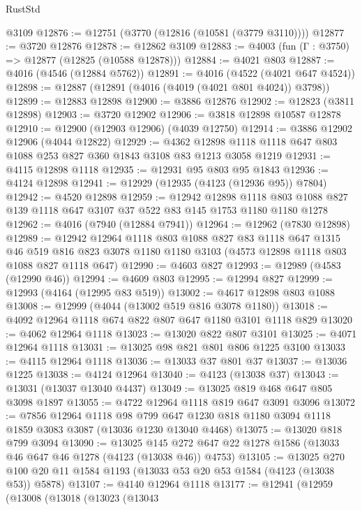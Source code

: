 \begin{lexlean}{RustStd}
\begin{coremodule}
    @3109
@12876 := @12751 (@3770 (@12816 (@10581 (@3779 @3110))))
@12877 := @3720 @12876
@12878 := @12862 @3109
@12883 := @4003 (fun (Γ : @3750) => @12877 (@12825 (@10588 @12878)))
@12884 := @4021 @803
@12887 := @4016 (@4546 (@12884 @5762))
@12891 := @4016 (@4522 (@4021 @647 @4524))
@12898 := @12887 (@12891 (@4016 (@4019 (@4021 @801 @4024)) @3798))
@12899 := @12883 @12898
@12900 := @3886 @12876
@12902 := @12823 (@3811 @12898)
@12903 := @3720 @12902
@12906 := @3818 @12898 @10587 @12878
@12910 := @12900 (@12903 @12906) (@4039 @12750)
@12914 := @3886 @12902 @12906 (@4044 @12822)
@12929 := @4362 @12898 @1118 @1118 @647 @803 @1088 @253 @827 @360 @1843 @3108 @83 @1213 @3058 @1219
@12931 := @4115 @12898 @1118
@12935 := @12931 @95 @803 @95 @1843
@12936 := @4124 @12898
@12941 := @12929 (@12935 (@4123 (@12936 @95)) @7804)
@12942 := @4520 @12898
@12959 := @12942
    @12898
    @1118
    @803
    @1088
    @827
    @139
    @1118
    @647
    @3107
    @37
    @522
    @83
    @145
    @1753
    @1180
    @1180
    @1278
@12962 := @4016 (@7940 (@12884 @7941))
@12964 := @12962 (@7830 @12898)
@12989 := @12942
    @12964
    @1118
    @803
    @1088
    @827
    @83
    @1118
    @647
    @1315
    @46
    @519
    @816
    @823
    @3078
    @1180
    @1180
    @3103
    (@4573 @12898 @1118 @803 @1088 @827 @1118 @647)
@12990 := @4603 @827
@12993 := @12989 (@4583 (@12990 @46))
@12994 := @4609 @803
@12995 := @12994 @827
@12999 := @12993 (@4164 (@12995 @83 @519))
@13002 := @4617 @12898 @803 @1088
@13008 := @12999 (@4044 (@13002 @519 @816 @3078 @1180))
@13018 := @4092 @12964 @1118 @674 @822 @807 @647 @1180 @3101 @1118 @829
@13020 := @4062 @12964 @1118
@13023 := @13020 @822 @807 @3101
@13025 := @4071 @12964 @1118
@13031 := @13025 @98 @821 @801 @806 @1225 @3100
@13033 := @4115 @12964 @1118
@13036 := @13033 @37 @801 @37
@13037 := @13036 @1225
@13038 := @4124 @12964
@13040 := @4123 (@13038 @37)
@13043 := @13031 (@13037 @13040 @4437)
@13049 := @13025 @819 @468 @647 @805 @3098 @1897
@13055 := @4722 @12964 @1118 @819 @647 @3091 @3096
@13072 := @7856
    @12964
    @1118
    @98
    @799
    @647
    @1230
    @818
    @1180
    @3094
    @1118
    @1859
    @3083
    @3087
    (@13036 @1230 @13040 @4468)
@13075 := @13020 @818 @799 @3094
@13090 := @13025
    @145
    @272
    @647
    @22
    @1278
    @1586
    (@13033 @46 @647 @46 @1278 (@4123 (@13038 @46)) @4753)
@13105 := @13025 @270 @100 @20 @11 @1584 @1193 (@13033 @53 @20 @53 @1584 (@4123 (@13038 @53)) @5878)
@13107 := @4140 @12964 @1118
@13177 := @12941
    (@12959
      (@13008
        (@13018
          (@13023
            (@13043

\end{coremodule}
\end{lexlean}
